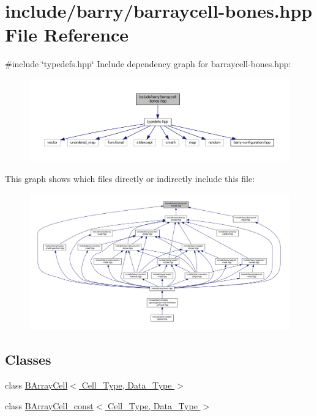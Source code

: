 \hypertarget{barraycell-bones_8hpp}{}\section{include/barry/barraycell-\/bones.hpp File Reference}
\label{barraycell-bones_8hpp}
{\ttfamily \#include \char`\"{}typedefs.\+hpp\char`\"{}}\newline
Include dependency graph for barraycell-\/bones.hpp\+:\nopagebreak
\begin{figure}[H]
\begin{center}
\leavevmode
\includegraphics[width=350pt]{barraycell-bones_8hpp__incl}
\end{center}
\end{figure}
This graph shows which files directly or indirectly include this file\+:\nopagebreak
\begin{figure}[H]
\begin{center}
\leavevmode
\includegraphics[width=350pt]{barraycell-bones_8hpp__dep__incl}
\end{center}
\end{figure}
\subsection*{Classes}
\begin{DoxyCompactItemize}
\item 
class \hyperlink{class_b_array_cell}{B\+Array\+Cell$<$ Cell\+\_\+\+Type, Data\+\_\+\+Type $>$}
\item 
class \hyperlink{class_b_array_cell__const}{B\+Array\+Cell\+\_\+const$<$ Cell\+\_\+\+Type, Data\+\_\+\+Type $>$}
\end{DoxyCompactItemize}
